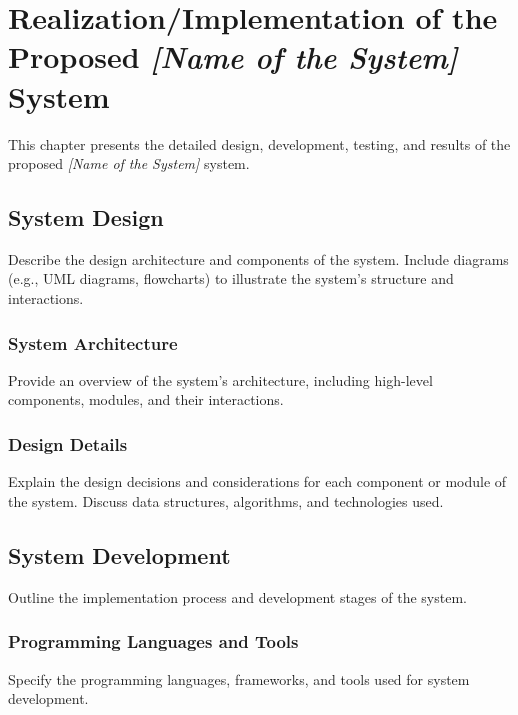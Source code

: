 
  
   
   	
   	\chapter{Realization/Implementation of the Proposed \textit{[Name of the System]} System}
   	
   	This chapter presents the detailed design, development, testing, and results of the proposed \textit{[Name of the System]} system.
   	
   	\section{System Design}
   	
   	Describe the design architecture and components of the system. Include diagrams (e.g., UML diagrams, flowcharts) to illustrate the system's structure and interactions.
   	
   	\subsection{System Architecture}
   	
   	Provide an overview of the system's architecture, including high-level components, modules, and their interactions.
   	
   	\subsection{Design Details}
   	
   	Explain the design decisions and considerations for each component or module of the system. Discuss data structures, algorithms, and technologies used.
   	
   	\section{System Development}
   	
   	Outline the implementation process and development stages of the system.
   	
   	\subsection{Programming Languages and Tools}
   	
   	Specify the programming languages, frameworks, and tools used for system development.
   	
